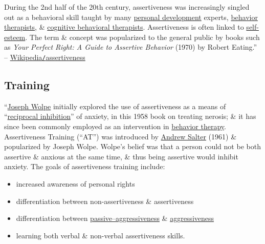 \documentclass[oneside]{book}
\numberwithin{equation}{section}
\begin{document}
During the 2nd half of the 20th century, assertiveness was increasingly singled out as a behavioral skill taught by many \href{https://en.wikipedia.org/wiki/Personal_development}{personal development} experts, \href{https://en.wikipedia.org/wiki/Behavior_therapist}{behavior therapists}, \& \href{https://en.wikipedia.org/wiki/Cognitive_behavioral_therapist}{cognitive behavioral therapists}. Assertiveness is often linked to \href{https://en.wikipedia.org/wiki/Self-esteem}{self-esteem}. The term \& concept was popularized to the general public by books such as \textit{Your Perfect Right: A Guide to Assertive Behavior} (1970) by Robert Eating.'' -- \href{https://en.wikipedia.org/wiki/Assertiveness}{Wikipedia\texttt{/}assertiveness}

\subsection{Training}
``\href{https://en.wikipedia.org/wiki/Joseph_Wolpe}{Joseph Wolpe} initially explored the use of assertiveness as a means of ``\href{https://en.wikipedia.org/wiki/Reciprocal_inhibition}{reciprocal inhibition}'' of anxiety, in this 1958 book on treating nerosis; \& it has since been commonly employed as an intervention in \href{https://en.wikipedia.org/wiki/Behavior_therapy}{behavior therapy}. Assertiveness Training (``AT'') was introduced by \href{https://en.wikipedia.org/wiki/Andrew_Salter}{Andrew Salter} (1961) \& popularized by Joseph Wolpe. Wolpe's belief was that a person could not be both assertive \& anxious at the same time, \& thus being assertive would inhibit anxiety. The goals of assertiveness training include:
\begin{itemize}
	\item increased awareness of personal rights
	\item differentiation between non-assertiveness \& assertiveness
	\item differentiation between \href{https://en.wikipedia.org/wiki/Passive%E2%80%93aggressiveness}{passive--aggressiveness} \& \href{https://en.wikipedia.org/wiki/Aggressiveness}{aggressiveness}
	\item learning both verbal \& non-verbal assertiveness skills.
\end{itemize}
\end{document}
